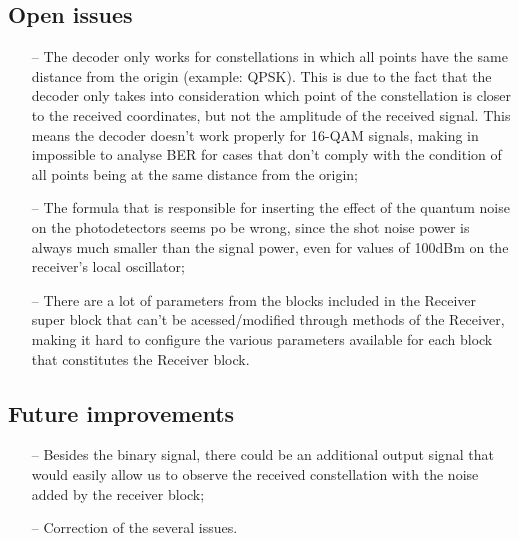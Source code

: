 \subsection*{Open issues}
\begin{itemize}
  \item[--] The decoder only works for constellations in which all points have the same distance from the origin (example: QPSK). This is due to the fact that the decoder only takes into consideration which point of the constellation is closer to the received coordinates, but not the amplitude of the received signal. This means the decoder doesn't work properly for 16-QAM signals, making in impossible to analyse BER for cases that don't comply with the condition of all points being at the same distance from the origin;
  \item[--] The formula that is responsible for inserting the effect of the quantum noise on the photodetectors seems po be wrong, since the shot noise power is always much smaller than the signal power, even for values of 100dBm on the receiver's local oscillator;
  \item[--] There are a lot of parameters from the blocks included in the Receiver super block that can't be acessed/modified through methods of the Receiver, making it hard to configure the various parameters available for each block that constitutes the Receiver block.
\end{itemize}
\subsection*{Future improvements}
\begin{itemize}
  \item[--] Besides the binary signal, there could be an additional output signal that would easily allow us to observe the received constellation with the noise added by the receiver block;
  \item[--] Correction of the several issues.
\end{itemize}

